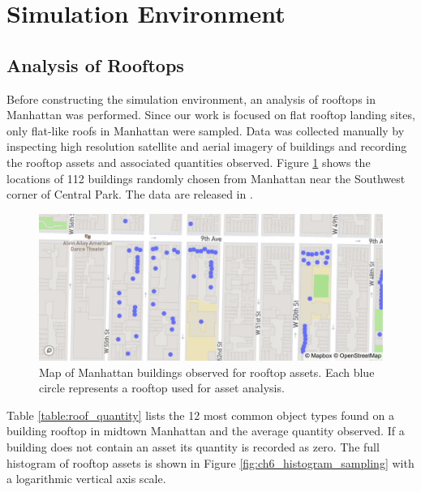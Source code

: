 \section{Simulation Environment}\label{sec:ch6_simulation_environment}

\subsection{Analysis of Rooftops}\label{sec:ch6_rooftop_analysis}

Before constructing the simulation environment, an analysis of rooftops in Manhattan was performed. Since our work is focused on flat rooftop landing sites, only flat-like roofs in Manhattan were sampled. Data was collected manually by inspecting high resolution satellite and aerial imagery of buildings and recording the rooftop assets and associated quantities observed. Figure \ref{fig:ch6_ny_rooftops} shows the locations of 112 buildings randomly chosen from Manhattan near the Southwest corner of Central Park. The  data are released in  \cite{Castagno_Github_UnrealLanding}.

\begin{figure}[ht!]
\centering
\includegraphics[angle=0,origin=c,width=.75\columnwidth]{chapter_6_landingsim/figs/map_ny_vector.pdf}
\caption[Map of Manhattan buildings observed for rooftop assets]{Map of Manhattan buildings observed for rooftop assets. Each blue circle represents a rooftop  used for asset analysis.}
\label{fig:ch6_ny_rooftops}
\end{figure}

Table \ref{table:roof_quantity} lists the 12 most common object types found on a building rooftop in midtown Manhattan and the average quantity observed. If a building does not contain an asset its quantity is recorded as zero.  The full histogram of rooftop assets is shown in Figure \ref{fig:ch6_histogram_sampling} with a logarithmic vertical axis scale.

